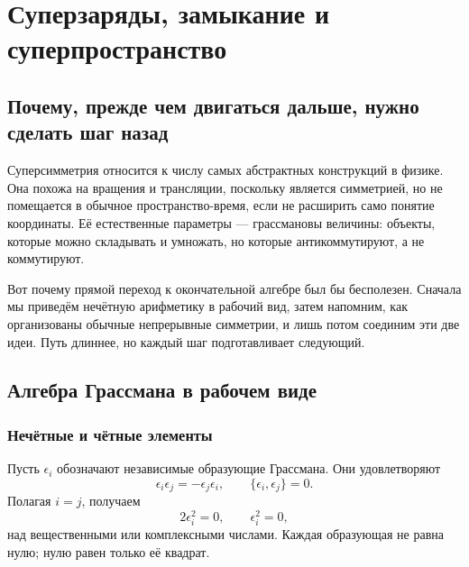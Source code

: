 \chapter{Суперзаряды, замыкание и суперпространство}


\section{Почему, прежде чем двигаться дальше, нужно сделать шаг назад}

Суперсимметрия относится к числу самых абстрактных конструкций в физике. Она похожа на вращения и трансляции, поскольку является симметрией, но не помещается в обычное пространство-время, если не расширить само понятие координаты. Её естественные параметры — грассмановы величины: объекты, которые можно складывать и умножать, но которые антикоммутируют, а не коммутируют.

Вот почему прямой переход к окончательной алгебре был бы бесполезен. Сначала мы приведём нечётную арифметику в рабочий вид, затем напомним, как организованы обычные непрерывные симметрии, и лишь потом соединим эти две идеи. Путь длиннее, но каждый шаг подготавливает следующий.

\section{Алгебра Грассмана в рабочем виде}

\subsection{Нечётные и чётные элементы}

Пусть \(\epsilon_i\) обозначают независимые образующие Грассмана. Они удовлетворяют
\begin{equation}
\epsilon_i\epsilon_j=-\epsilon_j\epsilon_i,
\qquad
\{\epsilon_i,\epsilon_j\}=0.
\end{equation}
Полагая \(i=j\), получаем
\begin{equation}
2\epsilon_i^2=0,
\qquad
\epsilon_i^2=0,
\end{equation}
над вещественными или комплексными числами. Каждая образующая не равна нулю; нулю равен только её квадрат.


